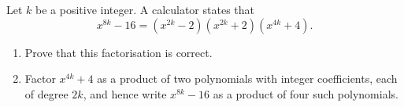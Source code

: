 Let $k$ be a positive integer. A calculator states that
\[
x^{8k}-16=\left(x^{2k}-2\right)\left(x^{2k}+2\right)\left(x^{4k}+4\right).
\]
\begin{enumerate}
\item[(a)] Prove that this factorisation is correct.
\item[(b)] Factor $x^{4k}+4$ as a product of two polynomials with integer coefficients, each of degree $2k$, and hence write $x^{8k}-16$ as a product of four such polynomials.
\end{enumerate}
